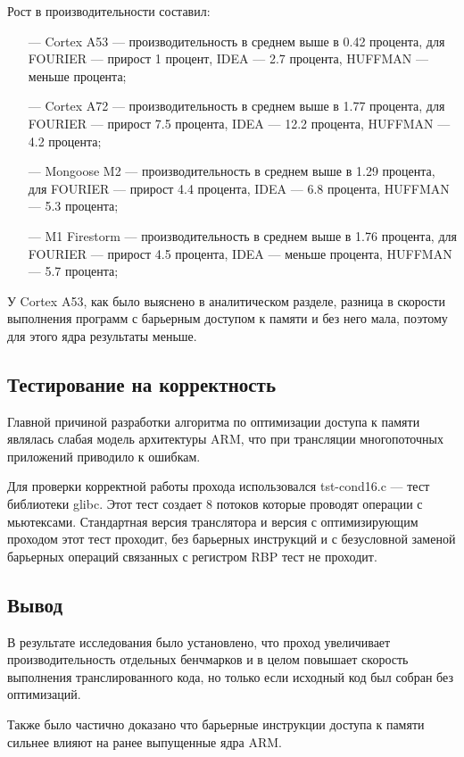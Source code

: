 Рост в производительности составил:
\begin{itemize}[leftmargin=1.6\parindent]
	\item[---] Cortex A53 --- производительность в среднем выше в 0.42 процента, для FOURIER --- прирост 1 процент, IDEA --- 2.7 процента, HUFFMAN --- меньше процента;
	\item[---] Cortex A72 --- производительность в среднем выше в 1.77 процента, для FOURIER --- прирост 7.5 процента, IDEA --- 12.2 процента, HUFFMAN --- 4.2 процента;
	\item[---] Mongoose M2 --- производительность в среднем выше в 1.29 процента, для FOURIER --- прирост 4.4 процента, IDEA --- 6.8 процента, HUFFMAN --- 5.3 процента;
	\item[---] M1 Firestorm --- производительность в среднем выше в 1.76 процента, для FOURIER --- прирост 4.5 процента, IDEA --- меньше процента, HUFFMAN --- 5.7 процента;
\end{itemize}

У Cortex A53, как было выяснено в аналитическом разделе, разница в скорости выполнения программ с барьерным доступом к памяти и без него мала, поэтому для этого ядра результаты меньше.

\subsection{Тестирование на корректность}

Главной причиной разработки алгоритма по оптимизации доступа к памяти являлась слабая модель архитектуры ARM, что при трансляции многопоточных приложений приводило к ошибкам.

Для проверки корректной работы прохода использовался tst-cond16.c --- тест библиотеки glibc. \cite{glibc} Этот тест создает 8 потоков которые проводят операции с мьютексами. Стандартная версия транслятора и версия с оптимизирующим проходом этот тест проходит, без барьерных инструкций и с безусловной заменой барьерных операций связанных с регистром RBP тест не проходит.

\subsection{Вывод}

В результате исследования было установлено, что проход увеличивает производительность отдельных бенчмарков и в целом повышает скорость выполнения транслированного кода, но только если исходный код был собран без оптимизаций.

Также было частично доказано что барьерные инструкции доступа к памяти сильнее влияют на ранее выпущенные ядра ARM.
